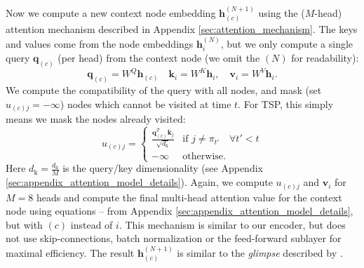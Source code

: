 Now we compute a new context node embedding $\mathbf{h}_{(c)}^{(N+1)}$ using the ($M$-head) attention mechanism described in Appendix \ref{sec:attention_mechanism}. The keys and values come from the node embeddings $\mathbf{h}_i^{(N)}$, but we only compute a single query $\mathbf{q}_{(c)}$ (per head) from the context node (we omit the $(N)$ for readability):
\begin{equation}
\label{eq:dec_qkv}
	\mathbf{q}_{(c)} = W^Q \mathbf{h}_{(c)} \quad \mathbf{k}_i = W^K \mathbf{h}_i, \quad \mathbf{v}_i = W^V \mathbf{h}_i.
\end{equation}
We compute the compatibility of the query with all nodes, and mask (set $u_{(c)j} = -\infty$) nodes which cannot be visited at time $t$. For TSP, this simply means we mask the nodes already visited:
\begin{equation}
\label{eq:dec_compatibility}
	u_{(c)j} = \begin{cases}
		\frac{\mathbf{q}_{(c)}^T \mathbf{k}_j}{\sqrt{d_{\text{k}}}} & \text{if } j \neq \pi_{t'} \quad \forall t' < t \\
        -\infty & \text{otherwise.}
    \end{cases}
\end{equation}
Here $d_{\text{k}} = \frac{d_{\text{h}}}{M}$ is the query/key dimensionality (see Appendix \ref{sec:appendix_attention_model_details}). Again, we compute $u_{(c)j}$ and $\mathbf{v}_i$ for $M = 8$ heads and compute the final multi-head attention value for the context node using equations -- from Appendix \ref{sec:appendix_attention_model_details}, but with $(c)$ instead of $i$. This mechanism is similar to our encoder, but does not use skip-connections, batch normalization or the feed-forward sublayer for maximal efficiency. The result $\mathbf{h}_{(c)}^{(N+1)}$ is similar to the \emph{glimpse} described by \citet{bello2016neural}.

